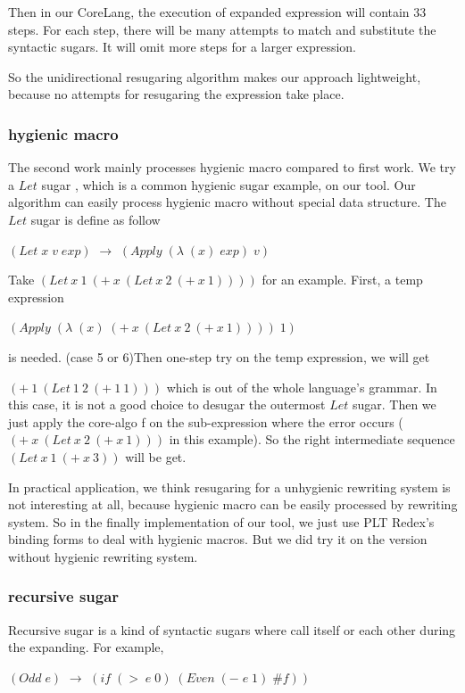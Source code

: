 Then in our CoreLang, the execution of expanded expression will contain 33 steps. For each step, there will be many attempts to match and substitute the syntactic sugars. It will omit more steps for a larger expression. 

So the unidirectional resugaring algorithm makes our approach lightweight, because no attempts for resugaring the expression take place.

\subsubsection{hygienic macro}
\label{mark:hygienic}

The second work\cite{hygienic} mainly processes hygienic macro compared to first work. We try a $Let$ sugar , which is a common hygienic sugar example, on our tool. Our algorithm can easily process hygienic macro without special data structure. The $Let$ sugar is define as follow

$(Let\;x\;v\;exp)$ $\rightarrow$ $(Apply\;(\lambda\;(x)\;exp)\;v)$

Take $(Let~x~1~(+~x~(Let~x~2~(+~x~1))))$ for an example. First, a temp expression

$(Apply\;(\lambda\;(x)\;(+~x~(Let~x~2~(+~x~1))))\;1)$

is needed. (case 5 or 6)Then one-step try on the temp expression, we will get

$(+~1~(Let~1~2~(+~1~1)))$ which is out of the whole language's grammar. In this case, it is not a good choice to desugar the outermost $Let$ sugar. Then we just apply the core-algo f on the sub-expression where the error occurs ($(+~x~(Let~x~2~(+~x~1)))$ in this example). So the right intermediate sequence $(Let~x~1~(+~x~3))$ will be get.

In practical application, we think resugaring for a unhygienic rewriting system is not interesting at all, because hygienic macro can be easily processed by rewriting system. So in the finally implementation of our tool, we just use PLT Redex's binding forms to deal with hygienic macros. But we did try it on the version without hygienic rewriting system.

\subsubsection{recursive sugar}
Recursive sugar is a kind of syntactic sugars where call itself or each other during the expanding. For example,

$(Odd\;e)$ $\rightarrow$ $(if\;(>\;e\;0)\;(Even\;(-\;e\;1)\;\#f))$

